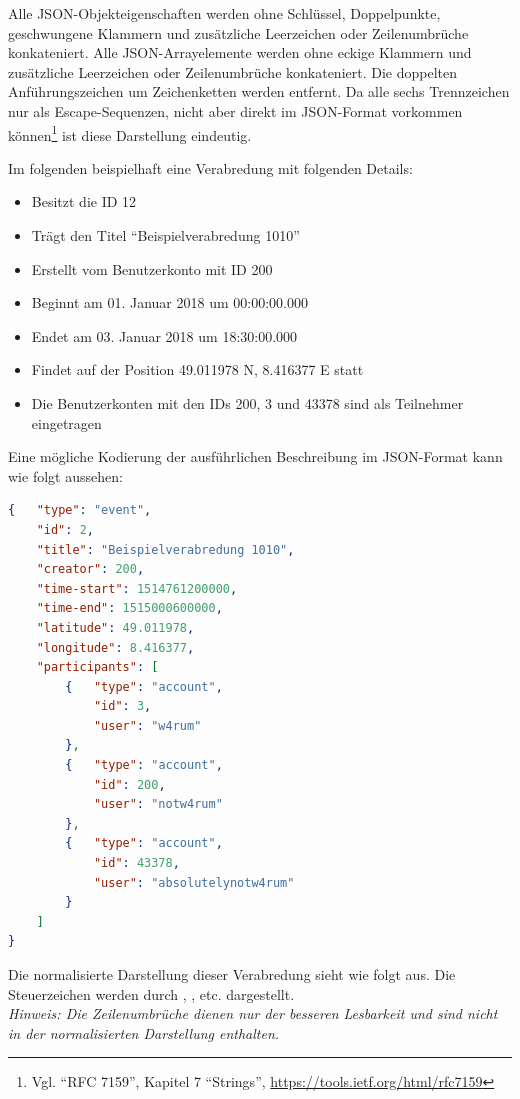 \documentclass[parskip=full,11pt]{scrartcl}
\begin{document}
Alle JSON-Objekteigenschaften werden ohne Schlüssel, Doppelpunkte, geschwungene
Klammern und zusätzliche Leerzeichen oder Zeilenumbrüche konkateniert.
Alle JSON-Arrayelemente werden ohne eckige Klammern und zusätzliche
Leerzeichen oder Zeilenumbrüche konkateniert.
Die doppelten Anführungszeichen um Zeichenketten werden entfernt.
Da alle sechs Trennzeichen nur als Escape-Sequenzen, nicht aber direkt im
JSON-Format vorkommen können\footnote{Vgl. \enquote{RFC 7159}, Kapitel 7
\enquote{Strings}, \url{https://tools.ietf.org/html/rfc7159}} ist diese
Darstellung eindeutig.

\par Im folgenden beispielhaft eine Verabredung mit folgenden Details:
\begin{itemize}
    \item Besitzt die ID 12
    \item Trägt den Titel \enquote{Beispielverabredung 1010}
    \item Erstellt vom Benutzerkonto mit ID 200
    \item Beginnt am 01. Januar 2018 um 00:00:00.000
    \item Endet am 03. Januar 2018 um 18:30:00.000
    \item Findet auf der Position 49.011978 N, 8.416377 E statt
    \item Die Benutzerkonten mit den IDs 200, 3 und 43378 sind als Teilnehmer
        eingetragen
\end{itemize}

Eine mögliche Kodierung der ausführlichen Beschreibung im JSON-Format kann wie
folgt aussehen:
\begin{lstlisting}[language=json,firstnumber=1]
{   "type": "event",
    "id": 2,
    "title": "Beispielverabredung 1010",
    "creator": 200,
    "time-start": 1514761200000,
    "time-end": 1515000600000,
    "latitude": 49.011978,
    "longitude": 8.416377,
    "participants": [
        {   "type": "account",
            "id": 3,
            "user": "w4rum"
        },
        {   "type": "account",
            "id": 200,
            "user": "notw4rum"
        },
        {   "type": "account",
            "id": 43378,
            "user": "absolutelynotw4rum"
        }
    ]
}
\end{lstlisting}

\newcommand*\circled[1]{\tikz[baseline=(char.base)]{
            \node[shape=circle,draw,inner sep=1pt] (char) {\scriptsize #1};}}

Die normalisierte Darstellung dieser Verabredung sieht wie folgt aus.
Die Steuerzeichen werden durch \circled{1}, \circled{2}, \circled{3} etc.
dargestellt.\\
\textit{Hinweis: Die Zeilenumbrüche dienen nur der besseren Lesbarkeit und sind
nicht in der normalisierten Darstellung enthalten.}
\end{document}
